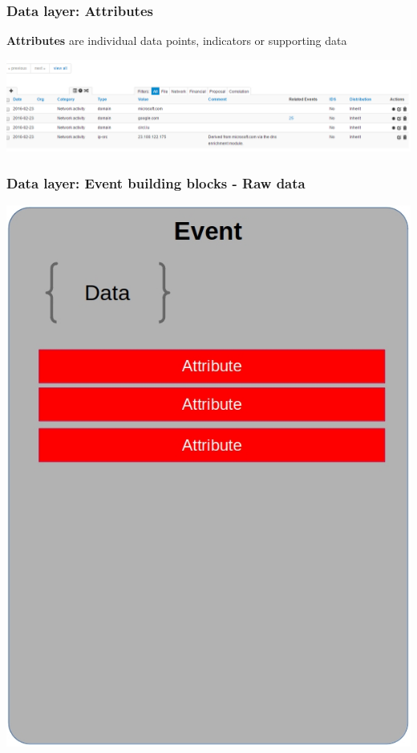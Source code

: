\begin{frame}[fragile]
    \frametitle{Data layer: Attributes}
        {\bf Attributes} are individual data points, indicators or supporting data
        \begin{center}
            \includegraphics[width=1.0\linewidth]{screenshots/enrichment4.png}
        \end{center}
\end{frame}

\begin{frame}
    \frametitle{Data layer: Event building blocks - Raw data}
        \begin{center}
            \includegraphics[scale=0.33]{screenshots/event-building-blocks/event-attribute.png}
        \end{center}
\end{frame}

